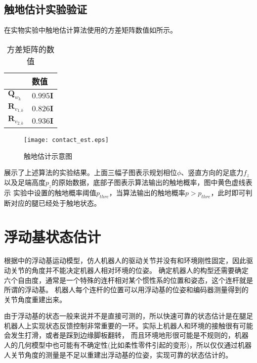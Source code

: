 \subsection{触地估计实验验证}
在实物实验中触地估计算法使用的方差矩阵数值如所示。
\begin{table}[htbp]
	\centering
	\caption{方差矩阵的数值}
	\label{tab:contact_noise}
	\begin{tabular}{m{2cm}<{\centering}m{2cm}<{\centering}}
		\toprule  %
		\fangsong{参数名称}   &数值  \\
		\midrule  %
		$\boldsymbol{Q}_{w_k}$    & $0.995\mathbf{I}$\\
		$\boldsymbol{R}_{v_{1,k}}$ &  $0.826 \mathbf{I}$ \\
		$\boldsymbol{R}_{v_{2,k}}$ & $0.936 \mathbf{I}$ \\
		\bottomrule %
	\end{tabular}
\end{table}
\begin{figure}[h]
    \centering
    \texttt{[image: contact\_est.eps]}
    \caption{\label{fig:contact_est}触地估计示意图}
\end{figure}
展示了上述算法的实验结果。上面三幅子图表示规划相位$\phi$、竖直方向的足底力$f_z$以及足端高度$p_z$的原始数据，底部子图表示算法输出的触地概率，图中黄色虚线表示
实验中设置的触地概率阈值$p_{thre}$，当算法输出的触地概率$p>p_{thre}$，此时即可判断对应的腿已经处于触地状态。
\section{浮动基状态估计}
\label{sec:com_est}
根据中的浮动基运动模型，仿人机器人的驱动关节并没有和环境刚性固定，因此驱动关节的角度并不能决定机器人相对环境的位姿。
确定机器人的构型还需要确定六个自由度，通常是一个特殊的连杆相对某个惯性系的位置和姿态，这个连杆就是所谓的浮动基。
机器人每个连杆的位置可以用浮动基的位姿和编码器测量得到的关节角度重建出来。

由于浮动基的状态一般来说并不是直接可测的，所以快速可靠的状态估计是在腿足机器人上实现状态反馈控制非常重要的一环。实际上机器人和环境的接触很有可能会发生打滑，或者是踩到边缘脚板翻转，
而且环境地形很可能是不规则的，机器人的几何模型中也可能有不确定性(比如柔性零件引起的变形)，所以仅仅通过机器人关节角度的测量是不足以重建出浮动基的位姿，实现可靠的状态估计的。

